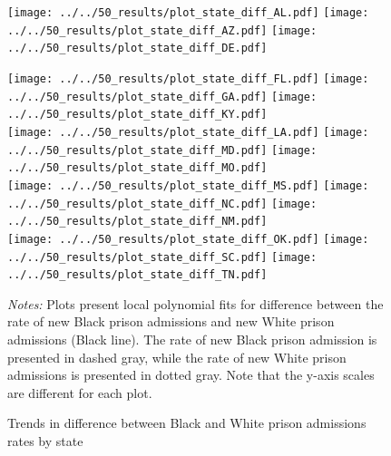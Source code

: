 \documentclass[12pt]{article}
\begin{document}
 \begin{figure}[h!]
 	\begin{center}
 	\caption{Trends in difference between Black and White prison admissions rates by state}
 	\small

 		\vspace{.2in}
       \texttt{[image: ../../50\_results/plot\_state\_diff\_AL.pdf]}
 		\texttt{[image: ../../50\_results/plot\_state\_diff\_AZ.pdf]}
       \texttt{[image: ../../50\_results/plot\_state\_diff\_DE.pdf]}\\

       \vspace{.05in}

 			\texttt{[image: ../../50\_results/plot\_state\_diff\_FL.pdf]}
       \texttt{[image: ../../50\_results/plot\_state\_diff\_GA.pdf]}
       \texttt{[image: ../../50\_results/plot\_state\_diff\_KY.pdf]}\\





       \vspace{.05in}
      \texttt{[image: ../../50\_results/plot\_state\_diff\_LA.pdf]}
 			\texttt{[image: ../../50\_results/plot\_state\_diff\_MD.pdf]}
 			\texttt{[image: ../../50\_results/plot\_state\_diff\_MO.pdf]} \\

       \vspace{.05in}
       \texttt{[image: ../../50\_results/plot\_state\_diff\_MS.pdf]}
       \texttt{[image: ../../50\_results/plot\_state\_diff\_NC.pdf]}
       \texttt{[image: ../../50\_results/plot\_state\_diff\_NM.pdf]}\\

       \vspace{.05in}
       \texttt{[image: ../../50\_results/plot\_state\_diff\_OK.pdf]}
 			\texttt{[image: ../../50\_results/plot\_state\_diff\_SC.pdf]}
 			\texttt{[image: ../../50\_results/plot\_state\_diff\_TN.pdf]}\\
       \smallskip\smallskip\smallskip
 	\label{figure_difference_states1}
 	\end{center}
   {\singlespacing \scriptsize{\emph{Notes:} Plots present local polynomial fits for difference between the rate of new Black prison admissions and new White prison admissions (Black line).  The rate of new Black prison admission is presented in dashed gray, while the rate of new White prison admissions is presented in dotted gray. Note that the y-axis scales are different for each plot.}}
\end{figure} \normalsize
\end{document}
